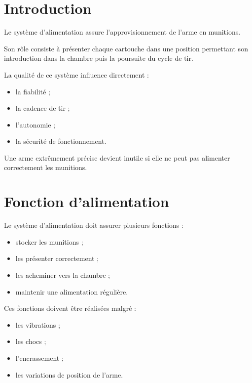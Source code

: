 
\section{Introduction}

Le système d'alimentation assure l'approvisionnement de l'arme en munitions.

Son rôle consiste à présenter chaque cartouche dans une position permettant
son introduction dans la chambre puis la poursuite du cycle de tir.

La qualité de ce système influence directement :

\begin{itemize}
    \item la fiabilité ;
    \item la cadence de tir ;
    \item l'autonomie ;
    \item la sécurité de fonctionnement.
\end{itemize}

\begin{aretenir}

Une arme extrêmement précise devient inutile si elle ne peut pas alimenter
correctement les munitions.

\end{aretenir}

\section{Fonction d'alimentation}

Le système d'alimentation doit assurer plusieurs fonctions :

\begin{itemize}
    \item stocker les munitions ;
    \item les présenter correctement ;
    \item les acheminer vers la chambre ;
    \item maintenir une alimentation régulière.
\end{itemize}

Ces fonctions doivent être réalisées malgré :

\begin{itemize}
    \item les vibrations ;
    \item les chocs ;
    \item l'encrassement ;
    \item les variations de position de l'arme.
\end{itemize}

